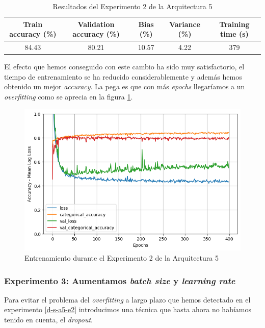 \documentclass{article}
\begin{document}
			\begin{table}[!h]
				\begin{center}
					\begin{tabular}{| c | c | c | c | c |}
						\textbf{Train accuracy (\%)} & \textbf{Validation accuracy (\%)} & \textbf{Bias (\%)} & \textbf{Variance (\%)} & \textbf{Training time (s)} \\ \hline
						84.43 & 80.21 & 10.57 & 4.22 & 379\\ \hline
					\end{tabular}
					\caption{Resultados del Experimento 2 de la Arquitectura 5}
					\label{tab:res-d-a5-e2}
				\end{center}
			\end{table}
		    
		    El efecto que hemos conseguido con este cambio ha sido muy satisfactorio, el tiempo de entrenamiento se ha reducido considerablemente y adem\'as hemos obtenido un mejor \textit{accuracy}. La pega es que con m\'as \textit{epochs} llegar\'iamos a un \textit{overfitting} como se aprecia en la figura \ref{d-tr-a5-e2}.
		    
			\begin{figure}[!h]
				\begin{center}
					\includegraphics[scale=0.5]{d-tr-a5-e2.png}		
					\caption{Entrenamiento durante el Experimento 2 de la Arquitectura 5}	
					\label{d-tr-a5-e2}
				\end{center}
			\end{figure}
			\newpage
		
		\subsubsection{Experimento 3: Aumentamos \textit{batch size} y \textit{learning rate}}
		\label{d-s-a5-e3}
			Para evitar el problema del \textit{overfitting} a largo plazo que hemos detectado en el experimento \ref{d-s-a5-e2} introducimos una t\'ecnica que hasta ahora no hab\'iamos tenido en cuenta, el \textit{dropout}.
		
\end{document}
